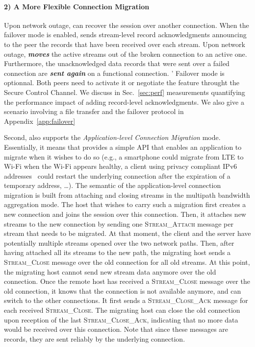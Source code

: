 \paragraph*{2) A More Flexible Connection Migration}

Upon network outage, \tcpls can recover the session over another \tcp
connection. When the failover mode is enabled, \tcpls sends stream-level record
acknowledgments announcing to the peer the records that have been received
over each stream. Upon network outage, \tcpls \textbf{\textit{moves}} the
active streams out of the broken \tcp connection to an active one. Furthermore,
the unacknowledged data records that were sent over a failed \tcp connection are
\textbf{\textit{sent again}} on a functional \tcp connection.
\tcpls' Failover mode is optionnal. Both peers need to activate it or
negotiate the feature throught the Secure Control Channel.
We discuss in Sec.~\ref{sec:perf} measurements quantifying the
performance impact of adding \tcpls record-level acknowledgments. We also give a
scenario involving a file transfer and the failover protocol in
Appendix~\ref{app:failover}

Second, \tcpls also supports the \textit{Application-level Connection Migration}
mode. Essentially, it means that \tcpls provides a simple API that enables an
application to migrate when it wishes to do so (e.g., a smartphone could migrate
from LTE to Wi-Fi when the Wi-Fi appears healthy, a client using privacy
compliant IPv6 addresses~\cite{rfc4941} could restart the underlying \tcp
connection after the expiration of a temporary address, \ldots). The semantic of
the application-level connection migration is built from attaching and closing
streams in the multipath bandwidth aggregation mode. The host that wishes to
carry such a migration first creates a new \tcp connection and joins the \tcpls
session over this connection. Then, it attaches new streams to the new
connection by sending one \textsc{Stream\_Attach} message per stream that needs
to be migrated. At that moment, the client and the server have potentially
multiple streams opened over the two network paths. Then, after having attached
all its streams to the new path, the migrating host sends a
\textsc{Stream\_Close} message over the old \tcp connection for all old streams.
At this point, the migrating host cannot send new stream data anymore over the
old connection. Once the remote host has received a \textsc{Stream\_Close}
message over the old \tcp connection, it knows that the connection is not
available anymore, and can switch to the other connections. It first sends a
\textsc{Stream\_Close\_Ack} message for each received \textsc{Stream\_Close}.
The migrating host can close the old connection upon reception of the last
\textsc{Stream\_Close\_Ack}, indicating that no more data would be received over
this connection. Note that since these messages are \tls records, they are sent
reliably by the underlying \tcp connection.

